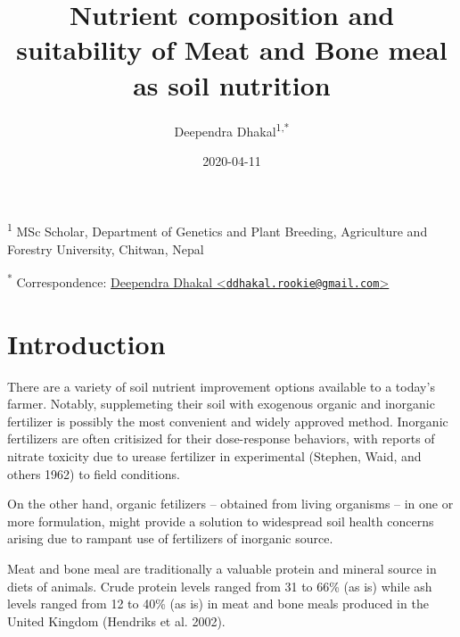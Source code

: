 \documentclass[
]{article}
\title{Nutrient composition and suitability of Meat and Bone meal as soil nutrition}
\author{Deependra Dhakal\textsuperscript{1,*}}
\date{2020-04-11}
\begin{document}
\maketitle

\textsuperscript{1} MSc Scholar, Department of Genetics and Plant Breeding, Agriculture and Forestry University, Chitwan, Nepal

\textsuperscript{*} Correspondence: \href{mailto:ddhakal.rookie@gmail.com}{Deependra Dhakal \textless{}\href{mailto:ddhakal.rookie@gmail.com}{\nolinkurl{ddhakal.rookie@gmail.com}}\textgreater{}}

\hypertarget{introduction}{%
\section{Introduction}\label{introduction}}

There are a variety of soil nutrient improvement options available to a today's farmer. Notably, supplemeting their soil with exogenous organic and inorganic fertilizer is possibly the most convenient and widely approved method. Inorganic fertilizers are often critisized for their dose-response behaviors, with reports of nitrate toxicity due to urease fertilizer in experimental (Stephen, Waid, and others 1962) to field conditions.

On the other hand, organic fetilizers -- obtained from living organisms -- in one or more formulation, might provide a solution to widespread soil health concerns arising due to rampant use of fertilizers of inorganic source.

Meat and bone meal are traditionally a valuable protein and mineral source in diets of animals. Crude protein levels ranged from 31 to 66\% (as is) while ash levels ranged from 12 to 40\% (as is) in meat and bone meals produced in the United Kingdom (Hendriks et al. 2002).
\end{document}
